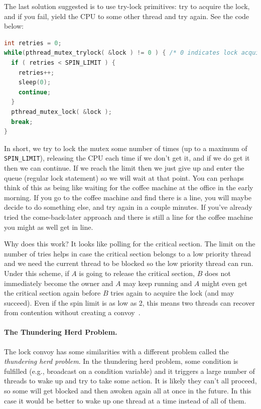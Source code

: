 \documentclass[a4paper]{report}
\begin{document}
The last solution suggested is to use try-lock primitives: try to acquire the lock, and if you fail, yield the CPU to some other thread and try again. See the code below:

\begin{lstlisting}[language=C]
int retries = 0;
while(pthread_mutex_trylock( &lock ) != 0 ) { /* 0 indicates lock acquired */
  if ( retries < SPIN_LIMIT ) {
    retries++;
    sleep(0);
    continue;
  }
  pthread_mutex_lock( &lock );
  break;
}
\end{lstlisting}

In short, we try to lock the mutex some number of times (up to a maximum of \texttt{SPIN\_LIMIT}), releasing the CPU each time if we don't get it, and if we do get it then we can continue. If we reach the limit then we just give up and enter the queue (regular lock statement) so we will wait at that point. You can perhaps think of this as being like waiting for the coffee machine at the office in the early morning. If you go to the coffee machine and find there is a line, you will maybe decide to do something else, and try again in a couple minutes. If you've already tried the come-back-later approach and there is still a line for the coffee machine you might as well get in line.

Why does this work? It looks like polling for the critical section. The limit on the number of tries helps in case the critical section belongs to a low priority thread and we need the current thread to be blocked so the low priority thread can run. Under this scheme, if $A$ is going to release the critical section, $B$ does not immediately become the owner and $A$ may keep running and $A$ might even get the critical section again before $B$ tries again to acquire the lock (and may succeed). Even if the spin limit is as low as 2, this means two threads can recover from contention without creating a convoy~\cite{lockconvoys}. 

\paragraph{The Thundering Herd Problem.} The lock convoy has some similarities with a different problem called the \textit{thundering herd problem}. In the thundering herd problem, some condition is fulfilled (e.g., broadcast on a condition variable) and it triggers a large number of threads to wake up and try to take some action. It is likely they can't all proceed, so some will get blocked and then awoken again all at once in the future. In this case it would be better to wake up one thread at a time instead of all of them.
\end{document}
